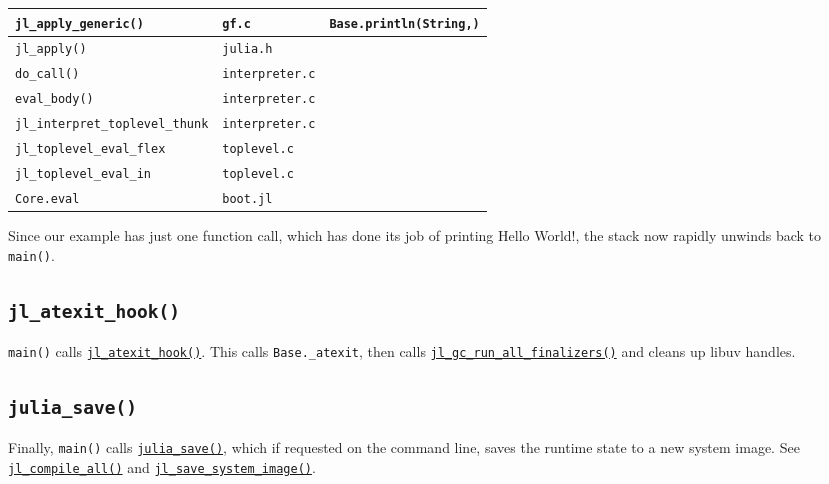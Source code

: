 \begin{table}[h]
\begin{tabulary}{\linewidth}{|L|L|L|}
\hline
\texttt{jl\_apply\_generic()} & \texttt{gf.c} & \texttt{Base.println(String,)} \\
\hline
\texttt{jl\_apply()} & \texttt{julia.h} &  \\
\hline
\texttt{do\_call()} & \texttt{interpreter.c} &  \\
\hline
\texttt{eval\_body()} & \texttt{interpreter.c} &  \\
\hline
\texttt{jl\_interpret\_toplevel\_thunk} & \texttt{interpreter.c} &  \\
\hline
\texttt{jl\_toplevel\_eval\_flex} & \texttt{toplevel.c} &  \\
\hline
\texttt{jl\_toplevel\_eval\_in} & \texttt{toplevel.c} &  \\
\hline
\texttt{Core.eval} & \texttt{boot.jl} &  \\
\hline
\end{tabulary}

\end{table}



Since our example has just one function call, which has done its job of printing {\textquotedbl}Hello World!{\textquotedbl}, the stack now rapidly unwinds back to \texttt{main()}.



\hypertarget{8766302654766843311}{}


\subsection{\texttt{jl\_atexit\_hook()}}



\texttt{main()} calls \href{https://github.com/JuliaLang/julia/blob/master/src/init.c}{\texttt{jl\_atexit\_hook()}}. This calls \texttt{Base.\_atexit}, then calls \href{https://github.com/JuliaLang/julia/blob/master/src/gc.c}{\texttt{jl\_gc\_run\_all\_finalizers()}} and cleans up libuv handles.



\hypertarget{6367994784846959684}{}


\subsection{\texttt{julia\_save()}}



Finally, \texttt{main()} calls \href{https://github.com/JuliaLang/julia/blob/master/src/init.c}{\texttt{julia\_save()}}, which if requested on the command line, saves the runtime state to a new system image. See \href{https://github.com/JuliaLang/julia/blob/master/src/gf.c}{\texttt{jl\_compile\_all()}} and \href{https://github.com/JuliaLang/julia/blob/master/src/staticdata.c}{\texttt{jl\_save\_system\_image()}}.



